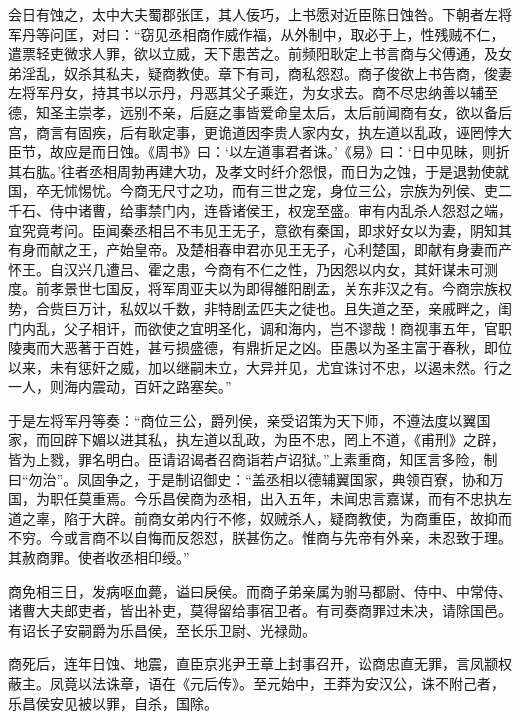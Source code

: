 \documentclass[12pt,UTF8]{ctexbook}
\begin{document}
会日有蚀之，太中大夫蜀郡张匡，其人佞巧，上书愿对近臣陈日蚀咎。下朝者左将军丹等问匡，对曰：“窃见丞相商作威作福，从外制中，取必于上，性残贼不仁，遣票轻吏微求人罪，欲以立威，天下患苦之。前频阳耿定上书言商与父傅通，及女弟淫乱，奴杀其私夫，疑商教使。章下有司，商私怨怼。商子俊欲上书告商，俊妻左将军丹女，持其书以示丹，丹恶其父子乘迕，为女求去。商不尽忠纳善以辅至德，知圣主崇孝，远别不亲，后庭之事皆爱命皇太后，太后前闻商有女，欲以备后宫，商言有固疾，后有耿定事，更诡道因李贵人家内女，执左道以乱政，诬罔悖大臣节，故应是而日蚀。《周书》曰：‘以左道事君者诛。’《易》曰：‘日中见昧，则折其右肱。’往者丞相周勃再建大功，及孝文时纤介怨恨，而日为之蚀，于是退勃使就国，卒无怵惕忧。今商无尺寸之功，而有三世之宠，身位三公，宗族为列侯、吏二千石、侍中诸曹，给事禁门内，连昏诸侯王，权宠至盛。审有内乱杀人怨怼之端，宜究竟考问。臣闻秦丞相吕不韦见王无子，意欲有秦国，即求好女以为妻，阴知其有身而献之王，产始皇帝。及楚相春申君亦见王无子，心利楚国，即献有身妻而产怀王。自汉兴几遭吕、霍之患，今商有不仁之性，乃因怨以内女，其奸谋未可测度。前孝景世七国反，将军周亚夫以为即得雒阳剧孟，关东非汉之有。今商宗族权势，合赀巨万计，私奴以千数，非特剧孟匹夫之徒也。且失道之至，亲戚畔之，闺门内乱，父子相讦，而欲使之宜明圣化，调和海内，岂不谬哉！商视事五年，官职陵夷而大恶著于百姓，甚亏损盛德，有鼎折足之凶。臣愚以为圣主富于春秋，即位以来，未有惩奸之威，加以继嗣未立，大异并见，尤宜诛讨不忠，以遏未然。行之一人，则海内震动，百奸之路塞矣。”



于是左将军丹等奏：“商位三公，爵列侯，亲受诏策为天下师，不遵法度以翼国家，而回辟下媚以进其私，执左道以乱政，为臣不忠，罔上不道，《甫刑》之辟，皆为上戮，罪名明白。臣请诏谒者召商诣若卢诏狱。”上素重商，知匡言多险，制曰“勿治”。凤固争之，于是制诏御史：“盖丞相以德辅翼国家，典领百寮，协和万国，为职任莫重焉。今乐昌侯商为丞相，出入五年，未闻忠言嘉谋，而有不忠执左道之辜，陷于大辟。前商女弟内行不修，奴贼杀人，疑商教使，为商重臣，故抑而不穷。今或言商不以自悔而反怨怼，朕甚伤之。惟商与先帝有外亲，未忍致于理。其赦商罪。使者收丞相印绶。”



商免相三日，发病呕血薨，谥曰戾侯。而商子弟亲属为驸马都尉、侍中、中常侍、诸曹大夫郎吏者，皆出补吏，莫得留给事宿卫者。有司奏商罪过未决，请除国邑。有诏长子安嗣爵为乐昌侯，至长乐卫尉、光禄勋。



商死后，连年日蚀、地震，直臣京兆尹王章上封事召开，讼商忠直无罪，言凤颛权蔽主。凤竟以法诛章，语在《元后传》。至元始中，王莽为安汉公，诛不附己者，乐昌侯安见被以罪，自杀，国除。
\end{document}
